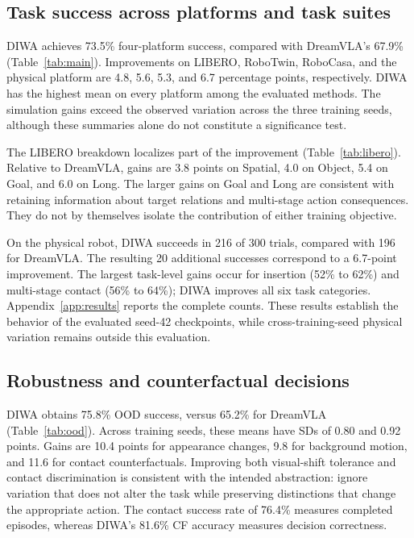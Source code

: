 \documentclass{article}
\begin{document}
\subsection{Task success across platforms and task suites}

DIWA achieves 73.5\% four-platform success, compared with DreamVLA's 67.9\% (Table~\ref{tab:main}). Improvements on LIBERO, RoboTwin, RoboCasa, and the physical platform are 4.8, 5.6, 5.3, and 6.7 percentage points, respectively. DIWA has the highest mean on every platform among the evaluated methods. The simulation gains exceed the observed variation across the three training seeds, although these summaries alone do not constitute a significance test.


The LIBERO breakdown localizes part of the improvement (Table~\ref{tab:libero}). Relative to DreamVLA, gains are 3.8 points on Spatial, 4.0 on Object, 5.4 on Goal, and 6.0 on Long. The larger gains on Goal and Long are consistent with retaining information about target relations and multi-stage action consequences. They do not by themselves isolate the contribution of either training objective.

On the physical robot, DIWA succeeds in 216 of 300 trials, compared with 196 for DreamVLA. The resulting 20 additional successes correspond to a 6.7-point improvement. The largest task-level gains occur for insertion (52\% to 62\%) and multi-stage contact (56\% to 64\%); DIWA improves all six task categories. Appendix~\ref{app:results} reports the complete counts. These results establish the behavior of the evaluated seed-42 checkpoints, while cross-training-seed physical variation remains outside this evaluation.

\subsection{Robustness and counterfactual decisions}

DIWA obtains 75.8\% OOD success, versus 65.2\% for DreamVLA (Table~\ref{tab:ood}). Across training seeds, these means have SDs of 0.80 and 0.92 points. Gains are 10.4 points for appearance changes, 9.8 for background motion, and 11.6 for contact counterfactuals. Improving both visual-shift tolerance and contact discrimination is consistent with the intended abstraction: ignore variation that does not alter the task while preserving distinctions that change the appropriate action. The contact success rate of 76.4\% measures completed episodes, whereas DIWA's 81.6\% CF accuracy measures decision correctness.
\end{document}
